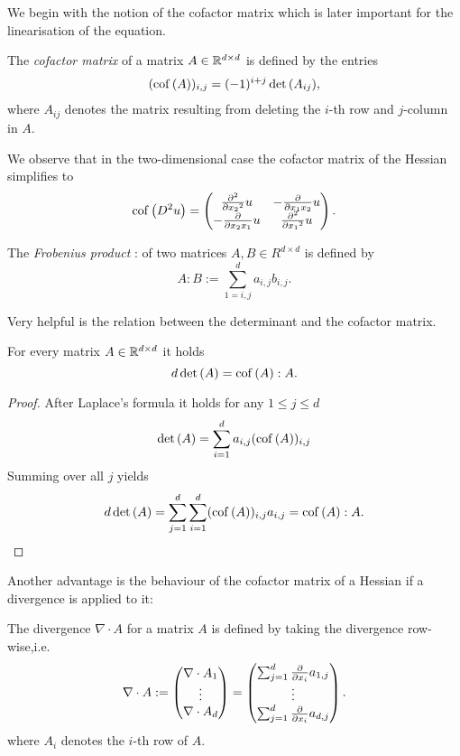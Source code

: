 We begin with the notion of the cofactor matrix which is later important for the linearisation of the \MA equation.
\begin{definition} \label{def: cof matrix}
	The \emph{cofactor matrix} of a matrix $A \in \mathbb{R}^{d \times d}$ is defined by the entries
	\begin{align}
	(\operatorname{cof} \left( A \right) )_{i,j} = (-1)^{i+j} \det{\left(A_{ij}\right)},
	\end{align}
	where $A_{ij}$ denotes the matrix resulting from deleting the $i$-th row and $j$-column in $A$.
\end{definition}

We observe that in the two-dimensional case the cofactor matrix of the Hessian simplifies to
\begin{align}
\operatorname{cof} \left( D^2 u \right) = \begin{pmatrix}
								\frac {\partial^2} {\partial {x_2}^2} u & -\frac {\partial }{\partial x_1 x_2} u\\
								-\frac {\partial }{\partial x_2 x_1} u & \frac {\partial^2} {\partial {x_1}^2} u
							\end{pmatrix}.
\end{align}

\begin{definition} \label{def: frobenius product}
	The \emph{Frobenius product} : of two matrices $A, B \in R^{d \times d}$ is defined by
	\[
		A:B := \sum_{1 = i,j} ^d a_{i,j} b_{i,j}.
	\]
\end{definition}

Very helpful is the relation between the determinant and the cofactor matrix.
\begin{lemma}\label{la: rel det cofactor}
	For every matrix $A  \in \mathbb{R}^{d \times d}$ it holds
	\[
		d \det{\left(A\right)} = \operatorname{cof} \left( A \right): A.
	\]
\end{lemma}
\begin{proof}
	After Laplace's formula it holds for any $1 \leq j \leq d$
	\[
		\det{\left(A\right)} = \sum\limits_{i = 1}^{d} a_{i,j} (\operatorname{cof} \left( A \right) )_{i,j} 
	\]
	Summing over all $j$ yields
	\[
		d \det{\left(A\right)} = \sum\limits_{j= 1}^{d} \sum\limits_{i = 1}^{d} (\operatorname{cof} \left( A \right) )_{i,j}  a_{i,j}  = \operatorname{cof} \left( A \right): A.
	\]
\end{proof}

Another advantage is the behaviour of the cofactor matrix of a Hessian if a divergence is applied to it:
\begin{definition}
The divergence $\nabla \cdot A$ for a matrix $A$ is defined by taking the divergence row-wise,i.e.
\[
	\nabla \cdot A := \begin{pmatrix} \nabla \cdot A_1 \\ \vdots \\ \nabla \cdot A_d\end{pmatrix}
	= \begin{pmatrix} \sum_{j = 1}^{d} \frac \partial {\partial x_i} a_{1,j} \\ \vdots \\ \sum_{j = 1}^{d} \frac \partial {\partial x_i} a_{d,j}\end{pmatrix}.
\]
where $A_i$ denotes the $i$-th row of $A$.
	
\end{definition}

